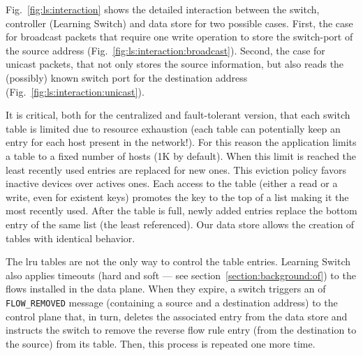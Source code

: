 Fig.~\ref{fig:ls:interaction}  shows the detailed interaction between the switch, controller (Learning Switch) and data store for two possible cases. 
First, the case for broadcast packets that require one write operation to store the switch-port  of the source address (Fig.~\ref{fig:ls:interaction:broadcast}). 
Second,  the case for unicast packets, that not only stores the source information, but also reads the (possibly) known switch port  for the destination address (Fig.~\ref{fig:ls:interaction:unicast}). 


It is critical, both for the centralized and fault-tolerant version, that each switch table is limited due to resource exhaustion (each table can potentially keep an entry for each host present in the network!).
For this reason the application limits a table to a fixed number of hosts (1K by default).
When this limit is reached the least recently used entries are replaced for new ones.  
This eviction policy favors inactive devices over actives ones.
Each access to the table (either a read or a write, even for existent keys) promotes the key to the top of a list making it the most recently used.
After the table is full, newly added entries replace the bottom entry of the same list (the least referenced). Our data store allows the creation of tables with identical behavior. 

The \gls{lru} tables are not the only way to control the table entries. Learning Switch also applies timeouts (hard and soft --- see section~\ref{section:background:of})  to the flows installed in the data plane. When they expire, a switch triggers an \gls{of} \texttt{FLOW\_REMOVED} message (containing a source and a destination address) to the control plane that, in turn, deletes the associated entry from the data store and instructs the switch to remove the reverse flow rule entry (from the destination to the source) from its table. Then, this process is repeated one more time. 

